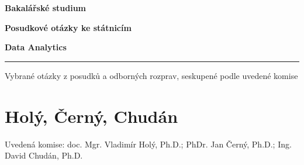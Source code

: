 \documentclass[12pt,a4paper]{article}
\begin{document}
\begin{titlepage}
  \centering
  \vspace*{2.4cm}
  {\Large\bfseries Bakalářské studium\par}
  \vspace{1.2cm}
  {\Huge\bfseries Posudkové otázky ke státnicím\par}
  \vspace{0.6cm}
  {\LARGE\bfseries Data Analytics\par}
  \vspace{0.8cm}
  \rule{0.72\textwidth}{0.4pt}\par
  \vspace{0.8cm}
  {\large Vybrané otázky z posudků a odborných rozprav, seskupené podle uvedené komise\par}
  \vfill
\end{titlepage}

\tableofcontents
\newpage

\section{Holý, Černý, Chudán}
Uvedená komise: doc. Mgr. Vladimír Holý, Ph.D.; PhDr. Jan Černý, Ph.D.; Ing. David Chudán, Ph.D.
\end{document}
